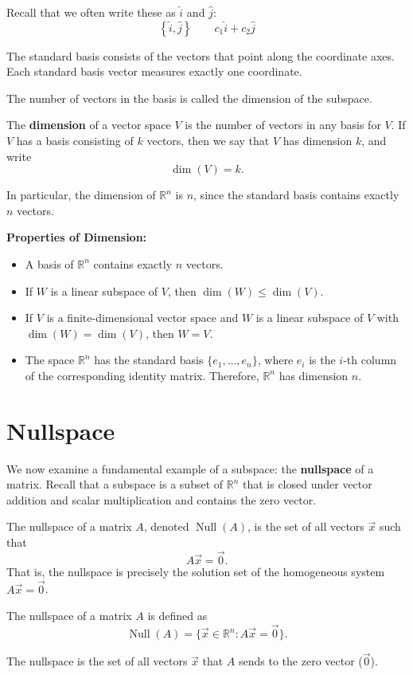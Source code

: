 Recall that we often write these as $\hat{i}$ and $\hat{j}$:
\[\left\{\hat{i}, \hat{j}\right\} \qquad c_1\hat{i} + c_2\hat{j}\]

The standard basis consists of the vectors that point along the coordinate axes.
Each standard basis vector measures exactly one coordinate.

The number of vectors in the basis is called the dimension of the subspace.
\begin{mdframed}[frametitle = {Dimension}, style = important]
The \textbf{dimension} of a vector space $V$ is the number of vectors in any basis for $V$.
If $V$ has a basis consisting of $k$ vectors, then we say that $V$ has dimension $k$, and write
\[
\dim(V) = k.
\]
\end{mdframed}
In particular, the dimension of 
$\mathbb{R}^n$ is 
$n$, since the standard basis contains exactly 
$n$ vectors.

\textbf{Properties of Dimension:}
\begin{itemize}
    \item A basis of $\mathbb{R}^n$ contains exactly $n$ vectors.
    \item If $W$ is a linear subspace of $V$, then $\dim(W) \leq \dim(V)$.
    \item If $V$ is a finite-dimensional vector space and $W$ is a linear subspace of $V$ with $\dim(W)=\dim(V)$, then $W=V$.
    \item The space $\mathbb{R}^n$ has the standard basis $\{e_1, \ldots, e_n\}$, where $e_i$ is the $i$-th column of the corresponding identity matrix. Therefore, $\mathbb{R}^n$ has dimension $n$.
\end{itemize}

\section{Nullspace}

We now examine a fundamental example of a subspace: the \textbf{nullspace} of a matrix. 
Recall that a subspace is a subset of $\mathbb{R}^n$ that is closed under vector addition and scalar multiplication and contains the zero vector.

The nullspace of a matrix $A$, denoted $\operatorname{Null}(A)$, is the set of all vectors $\vec{x}$ such that
\[
A\vec{x} = \vec{0}.
\]
That is, the nullspace is precisely the solution set of the homogeneous system $A\vec{x}=\vec{0}$.

\begin{mdframed}[frametitle = {Nullspace}, style = important]
The nullspace of a matrix $A$ is defined as
\[
\operatorname{Null}(A) = \{\vec{x} \in \mathbb{R}^n : A\vec{x} = \vec{0}\}.
\]

The nullspace is the set of all vectors $\vec{x}$ that $A$ sends to the zero vector ($\vec{0}$). 
\end{mdframed}

